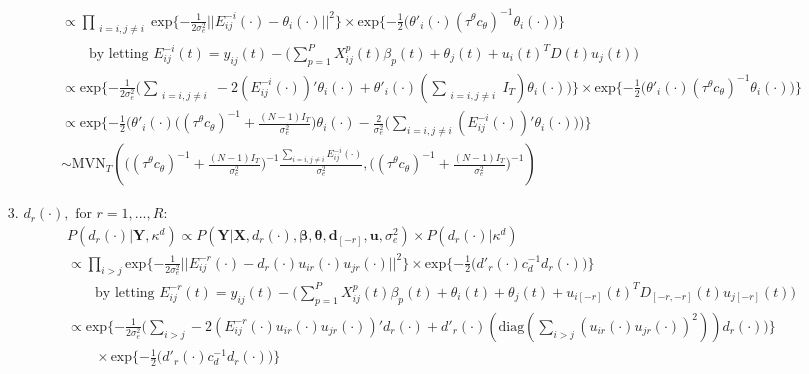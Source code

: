 \documentclass[a4paper]{article}
\begin{document}
\begin{itemize}
\begin{equation*}
\begin{aligned}
		&\propto\prod\limits_{\substack{i=i, j\neq i}}\mbox{exp}\{-\frac{1}{2\sigma_e^2}||E^{-i}_{ij}(\cdot)-\theta_{i}(\cdot)||^2\}\times \mbox{exp}\{-\frac{1}{2}\Big(\theta'_{i}(\cdot){(\tau^\theta c_\theta)}^{-1}\theta_{i}(\cdot)\Big)\}\\
		& \quad\quad\mbox{by letting } E^{-i}_{ij}(t)=y_{ij}(t)-\big(\sum_{p=1 }^PX^p_{ij}(t)\beta_p(t)+\theta_{j}(t)+u_i(t)^TD(t)u_j(t)\big)\\
		&\propto\mbox{exp}\{-\frac{1}{2\sigma_e^2}\Big(\sum\limits_{\substack{i=i, j\neq i}}-2(E^{-i}_{ij}(\cdot))'\theta_{i}(\cdot)+\theta'_{i}(\cdot)(\sum\limits_{\substack{i=i, j\neq i}}I_T)\theta_{i}(\cdot)\Big)\}\times \mbox{exp}\{-\frac{1}{2}\Big(\theta'_{i}(\cdot){(\tau^\theta c_\theta)}^{-1}\theta_{i}(\cdot)\Big)\}\\
		&\propto\mbox{exp}\{-\frac{1}{2}\Big(\theta'_{i}(\cdot)\Big({(\tau^\theta c_\theta)}^{-1}+\frac{(N-1)I_T}{\sigma_e^2}\Big)\theta_{i}(\cdot)-\frac{2}{\sigma_e^2}\Big(\sum_{i=i, j\neq i}(E^{-i}_{ij}(\cdot))'\theta_{i}(\cdot)\Big)\Big)\}\\
		& \sim \mbox{MVN}_T(\Big((\tau^\theta c_\theta)^{-1}+\frac{(N-1)I_T}{\sigma_e^2}\Big)^{-1}\frac{\sum_{i=i, j\neq i}E^{-i}_{ij}(\cdot)}{\sigma_e^2}, \Big((\tau^\theta c_\theta)^{-1}+\frac{(N-1)I_T}{\sigma_e^2}\Big)^{-1})
		\end{aligned}
		\end{equation*} 
	\item [3.] $d_r(\cdot), \mbox{ for } r=1,...,R$:
	\begin{equation*}
	\begin{aligned}
	&P(d_r(\cdot)|\boldsymbol{Y}, \kappa^d) \propto P(\boldsymbol{Y}|\boldsymbol{X}, d_r(\cdot), \boldsymbol{\beta}, \boldsymbol{\theta}, \boldsymbol{d}_{[-r]}, \boldsymbol{u},\sigma_e^2) \times P(d_r(\cdot)| \kappa^d) \\
	&\propto\prod\limits_{i>j}\mbox{exp}\{-\frac{1}{2\sigma_e^2}||E^{-r}_{ij}(\cdot)-d_r(\cdot)u_{ir}(\cdot)u_{jr}(\cdot)||^2\}\times \mbox{exp}\{-\frac{1}{2}\Big(d'_r(\cdot)c_d^{-1}d_r(\cdot)\Big)\}\\
	& \quad\quad\mbox{by letting } E^{-r}_{ij}(t)=y_{ij}(t)-\big(\sum_{p=1 }^PX^p_{ij}(t)\beta_p(t)+\theta_i(t)+\theta_j(t)+u_{i[-r]}(t)^TD_{[-r, -r]}(t)u_{j[-r]}(t)\big)\\
	&\propto\mbox{exp}\{-\frac{1}{2\sigma_e^2}\Big(\sum\limits_{i>j}-2(E^{-r}_{ij}(\cdot)u_{ir}(\cdot)u_{jr}(\cdot))'d_r(\cdot)+d'_r(\cdot)(\mbox{diag}(\sum\limits_{i>j}({u_{ir}(\cdot)u_{jr}(\cdot)})^2))d_r(\cdot)\Big)\}\\&\quad\quad\times \mbox{exp}\{-\frac{1}{2}\Big(d'_r(\cdot)c_d^{-1}d_r(\cdot)\Big)\}\\

\end{aligned}
\end{equation*}
\end{itemize}
\end{document}
